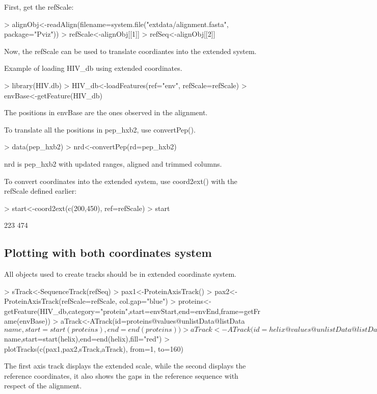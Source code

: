 \documentclass[11pt]{article}
\begin{document}
First, get the refScale:
\begin{Schunk}
\begin{Sinput}
> alignObj<-readAlign(filename=system.file("extdata/alignment.fasta", package="Pviz"))
> refScale<-alignObj[[1]]
> refSeq<-alignObj[[2]]
\end{Sinput}
\end{Schunk}

Now, the refScale can be used to translate coordiantes into the extended system.

Example of loading HIV_db using extended coordinates. 
\begin{Schunk}
\begin{Sinput}
> library(HIV.db)
> HIV_db<-loadFeatures(ref="env", refScale=refScale)
> envBase<-getFeature(HIV_db)
\end{Sinput}
\end{Schunk}

The positions in envBase are the ones observed in the alignment.

To translate all the positions in pep_hxb2, use convertPep().
\begin{Schunk}
\begin{Sinput}
> data(pep_hxb2)
> nrd<-convertPep(rd=pep_hxb2)
\end{Sinput}
\end{Schunk}

nrd is pep_hxb2 with updated ranges, aligned and trimmed columns.

To convert coordinates into the extended system, use coord2ext() with the refScale defined earlier:
\begin{Schunk}
\begin{Sinput}
> start<-coord2ext(c(200,450), ref=refScale)
> start
\end{Sinput}
\begin{Soutput}
[1] 223 474
\end{Soutput}
\end{Schunk}

\subsection{Plotting with both coordinates system}
All objects used to create tracks should be in extended coordinate system.
\begin{Schunk}
\begin{Sinput}
> sTrack<-SequenceTrack(refSeq)
> pax1<-ProteinAxisTrack()
> pax2<-ProteinAxisTrack(refScale=refScale, col.gap="blue")
> proteins<-getFeature(HIV_db,category="protein",start=envStart,end=envEnd,frame=getFrame(envBase))
> aTrack<-ATrack(id=proteins@values@unlistData@listData$name,start=start(proteins),end=end(proteins))
> aTrack<-ATrack(id=helix@values@unlistData@listData$name,start=start(helix),end=end(helix),fill="red")
> plotTracks(c(pax1,pax2,sTrack,aTrack), from=1, to=160)
\end{Sinput}
\end{Schunk}
The first axis track displays the extended scale, while the second displays the reference coordinates, it also shows the gaps in the reference sequence with respect of the alignment.
\end{document}
